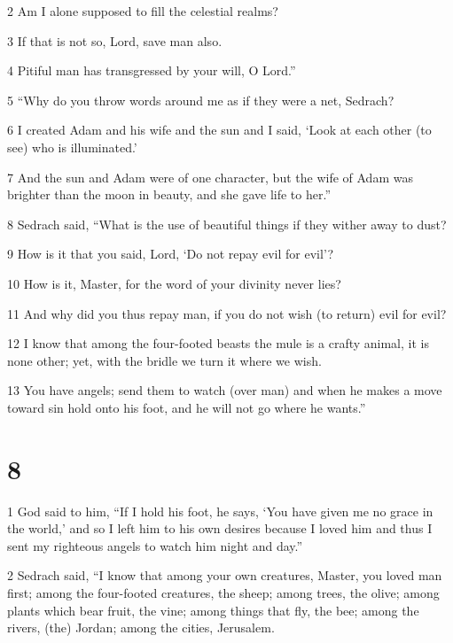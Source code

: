\par 2 Am I alone supposed to fill the celestial realms? 

\par 3 If that is not so, Lord, save man also. 

\par 4 Pitiful man has transgressed by your will, O Lord.” 

\par 5 “Why do you throw words around me as if they were a net, Sedrach? 

\par 6 I created Adam and his wife and the sun and I said, ‘Look at each other (to see) who is illuminated.’ 

\par 7 And the sun and Adam were of one character, but the wife of Adam was brighter than the moon in beauty, and she gave life to her.” 

\par 8 Sedrach said, “What is the use of beautiful things if they wither away to dust? 

\par 9 How is it that you said, Lord, ‘Do not repay evil for evil’? 

\par 10 How is it, Master, for the word of your divinity never lies? 

\par 11 And why did you thus repay man, if you do not wish (to return) evil for evil? 

\par 12 I know that among the four-footed beasts the mule is a crafty animal, it is none other; yet, with the bridle we turn it where we wish. 

\par 13 You have angels; send them to watch (over man) and when he makes a move 
toward sin hold onto his foot, and he will not go where he wants.” 

\chapter{8}

\par 1 God said to him, “If I hold his foot, he says, ‘You have given me no grace in the world,’ and so I left him to his own desires because I loved him and thus I sent my righteous angels to watch him night and day.” 

\par 2 Sedrach said, “I know that among your own creatures, Master, you loved man first; among the four-footed creatures, the sheep; among trees, the olive; among plants which bear fruit, the vine; among things that fly, the bee; among the rivers, (the) Jordan; among the cities, Jerusalem. 

